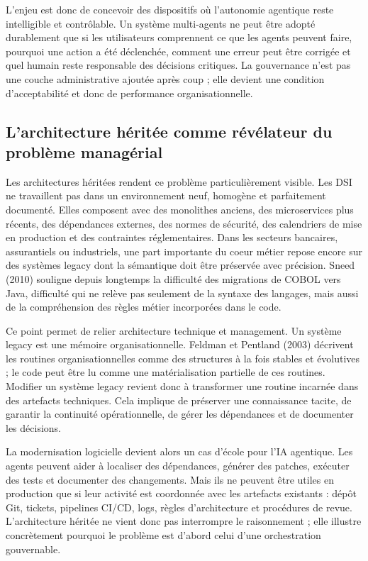 L'enjeu est donc de concevoir des dispositifs où l'autonomie agentique reste intelligible et contrôlable. Un système multi-agents ne peut être adopté durablement que si les utilisateurs comprennent ce que les agents peuvent faire, pourquoi une action a été déclenchée, comment une erreur peut être corrigée et quel humain reste responsable des décisions critiques. La gouvernance n'est pas une couche administrative ajoutée après coup ; elle devient une condition d'acceptabilité et donc de performance organisationnelle.


\subsection{L'architecture héritée comme révélateur du problème managérial}\label{larchitecture-huxe9rituxe9e-comme-ruxe9vuxe9lateur-du-probluxe8me-managuxe9rial}

Les architectures héritées rendent ce problème particulièrement visible. Les DSI ne travaillent pas dans un environnement neuf, homogène et parfaitement documenté. Elles composent avec des monolithes anciens, des microservices plus récents, des dépendances externes, des normes de sécurité, des calendriers de mise en production et des contraintes réglementaires. Dans les secteurs bancaires, assurantiels ou industriels, une part importante du coeur métier repose encore sur des systèmes legacy dont la sémantique doit être préservée avec précision. Sneed (2010) souligne depuis longtemps la difficulté des migrations de COBOL vers Java, difficulté qui ne relève pas seulement de la syntaxe des langages, mais aussi de la compréhension des règles métier incorporées dans le code.

Ce point permet de relier architecture technique et management. Un système legacy est une mémoire organisationnelle. Feldman et Pentland (2003) décrivent les routines organisationnelles comme des structures à la fois stables et évolutives ; le code peut être lu comme une matérialisation partielle de ces routines. Modifier un système legacy revient donc à transformer une routine incarnée dans des artefacts techniques. Cela implique de préserver une connaissance tacite, de garantir la continuité opérationnelle, de gérer les dépendances et de documenter les décisions.

La modernisation logicielle devient alors un cas d'école pour l'IA agentique. Les agents peuvent aider à localiser des dépendances, générer des patches, exécuter des tests et documenter des changements. Mais ils ne peuvent être utiles en production que si leur activité est coordonnée avec les artefacts existants : dépôt Git, tickets, pipelines CI/CD, logs, règles d'architecture et procédures de revue. L'architecture héritée ne vient donc pas interrompre le raisonnement ; elle illustre concrètement pourquoi le problème est d'abord celui d'une orchestration gouvernable.


